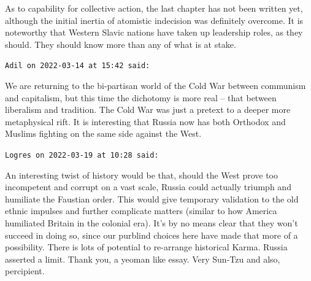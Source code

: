 \begin{footnotesize}
\begin{sffamily}
As to capability for collective action, the last chapter has not been written yet, although the initial inertia of atomistic indecision was definitely overcome. It is noteworthy that Western Slavic nations have taken up leadership roles, as they should. They should know more than any of what is at stake.

\hfill

\texttt{Adil on 2022-03-14 at 15:42 said:}

We are returning to the bi-partisan world of the Cold War between communism and capitalism, but this time the dichotomy is more real -- that between liberalism and tradition. The Cold War was just a pretext to a deeper more metaphysical rift. It is interesting that Russia now has both Orthodox and Muslims fighting on the same side against the West.

\hfill

\texttt{Logres on 2022-03-19 at 10:28 said:}

An interesting twist of history would be that, should the West prove too incompetent and corrupt on a vast scale, Russia could actually triumph and humiliate the Faustian order. This would give temporary validation to the old ethnic impulses and further complicate matters (similar to how America humiliated Britain in the colonial era). It's by no means clear that they won't succeed in doing so, since our purblind choices here have made that more of a possibility. There is lots of potential to re-arrange historical Karma. Russia asserted a limit. Thank you, a yeoman like essay. Very Sun-Tzu and also, percipient.

\end{sffamily}
\end{footnotesize}

